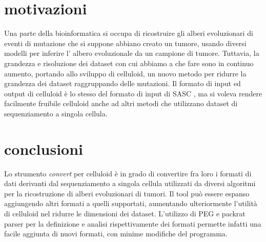 \section{motivazioni}
Una parte della bioinformatica si occupa di ricostruire gli alberi evoluzionari di eventi di mutazione che si suppone abbiano creato un tumore, usando diversi modelli per inferire l' albero evoluzionale da un campione di tumore. Tuttavia, la grandezza e risoluzione dei dataset con cui abbiamo a che fare sono in continuo aumento, portando allo sviluppo di celluloid\cite{patterson}, un nuovo metodo per ridurre la grandezza dei dataset raggruppando  delle mutazioni. Il formato di input ed output di celluloid è lo stesso del formato di input di SASC \cite{sasc}, ma si voleva rendere facilmente fruibile celluloid anche ad altri metodi che utilizzano dataset di sequenziamento a singola cellula.

\section{conclusioni}
Lo strumento \textit{convert} per celluloid è in grado di convertire fra loro i formati di dati derivanti dal sequenziamento a singola cellula utilizzati da diversi algoritmi per la ricostruzione di alberi evoluzionari di tumori. Il tool può essere espanso aggiungendo altri formati a quelli supportati, aumentando ulteriormente l'utilità di celluloid nel ridurre le dimensioni dei dataset. L'utilizzo di PEG e packrat parser per la definizione e analisi rispettivamente dei formati permette infatti una facile aggiunta di nuovi formati, con minime modifiche del programma.
